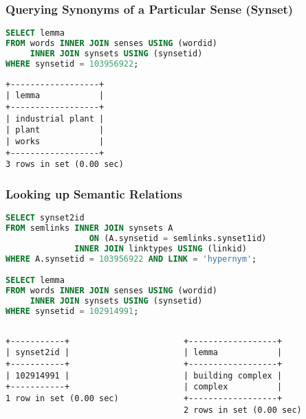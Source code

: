 \begin{frame}[fragile]
\frametitle{Querying Synonyms of a Particular Sense (Synset)}
    
\begin{lstlisting}[language=SQL]
SELECT lemma
FROM words INNER JOIN senses USING (wordid)
     INNER JOIN synsets USING (synsetid)
WHERE synsetid = 103956922;
\end{lstlisting}

\begin{lstlisting}
+------------------+
| lemma            |
+------------------+
| industrial plant |
| plant            |
| works            |
+------------------+
3 rows in set (0.00 sec)
\end{lstlisting}

\end{frame}


\begin{frame}[fragile]
\frametitle{Looking up Semantic Relations}

\begin{lstlisting}[language=SQL]
SELECT synset2id
FROM semlinks INNER JOIN synsets A 
                 ON (A.synsetid = semlinks.synset1id)
              INNER JOIN linktypes USING (linkid)
WHERE A.synsetid = 103956922 AND LINK = 'hypernym';

SELECT lemma
FROM words INNER JOIN senses USING (wordid)
     INNER JOIN synsets USING (synsetid)
WHERE synsetid = 102914991;
\end{lstlisting}

\begin{columns}[T]
\begin{column}{.45\textwidth}
\begin{lstlisting}[basicstyle=\ttfamily\footnotesize]
+-----------+
| synset2id |
+-----------+
| 102914991 |
+-----------+
1 row in set (0.00 sec)
\end{lstlisting}
\end{column}

\begin{column}{.49\textwidth}
\begin{lstlisting}[basicstyle=\ttfamily\footnotesize]
+------------------+
| lemma            |
+------------------+
| building complex |
| complex          |
+------------------+
2 rows in set (0.00 sec)
\end{lstlisting}
\end{column}
\end{columns}

\end{frame}



